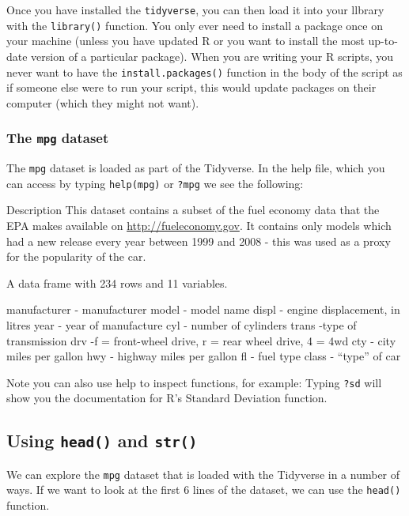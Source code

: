 \documentclass[
]{book}
\begin{document}
Once you have installed the \texttt{tidyverse}, you can then load it into your llbrary with the \texttt{library()} function. You only ever need to install a package once on your machine (unless you have updated R or you want to install the most up-to-date version of a particular package). When you are writing your R scripts, you never want to have the \texttt{install.packages()} function in the body of the script as if someone else were to run your script, this would update packages on their computer (which they might not want).

\hypertarget{the-mpg-dataset}{%
\subsubsection*{\texorpdfstring{The \texttt{mpg} dataset}{The mpg dataset}}\label{the-mpg-dataset}}

The \texttt{mpg} dataset is loaded as part of the Tidyverse. In the help file, which you can access by typing \texttt{help(mpg)} or \texttt{?mpg} we see the following:

Description This dataset contains a subset of the fuel economy data that the EPA makes available on \url{http://fueleconomy.gov}. It contains only models which had a new release every year between 1999 and 2008 - this was used as a proxy for the popularity of the car.

A data frame with 234 rows and 11 variables.

manufacturer - manufacturer model - model name displ - engine displacement, in litres year - year of manufacture cyl - number of cylinders trans -type of transmission drv -f = front-wheel drive, r = rear wheel drive, 4 = 4wd cty - city miles per gallon hwy - highway miles per gallon fl - fuel type class - ``type'' of car

Note you can also use help to inspect functions, for example: Typing \texttt{?sd} will show you the documentation for R's Standard Deviation function.

\hypertarget{using-head-and-str}{%
\subsection{\texorpdfstring{Using \texttt{head()} and \texttt{str()}}{Using head() and str()}}\label{using-head-and-str}}

We can explore the \texttt{mpg} dataset that is loaded with the Tidyverse in a number of ways. If we want to look at the first 6 lines of the dataset, we can use the \texttt{head()} function.
\end{document}
